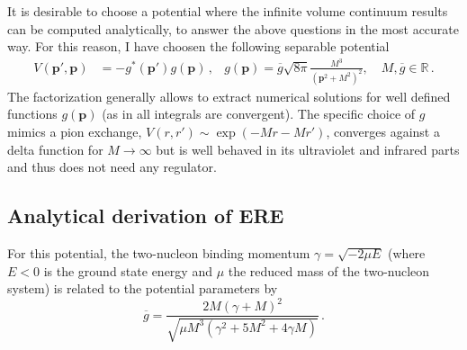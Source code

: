 \documentclass[
    aps,
    prl,
    showkeys,
    nofootinbib,
    floatfix
]{revtex4-1}
\renewcommand{\vec}[1]{\boldsymbol{#1}}
\begin{document}
It is desirable to choose a potential where the infinite volume continuum results can be computed analytically, to answer the above questions in the most accurate way.
For this reason, I have choosen the following separable potential
\begin{align}
	V(\vec p', \vec p) &= - g^*(\vec p') g(\vec p) \, ,
	&
	g(\vec{p})=\overline{g} \sqrt{8 \pi} \frac{M^{3}}{\left(\vec{p}^{2}+M^{2}\right)^{2}}, \quad M, \overline{g} \in \mathbb{R}
	\, .
\end{align}
The factorization generally allows to extract numerical solutions for well defined functions $g(\vec p)$ (as in all integrals are convergent).
The specific choice of $g$ mimics a pion exchange, $V(r, r') \sim \exp(- M r - M r')$, converges against a delta function for $M\to \infty$ but is well behaved in its ultraviolet and infrared parts and thus does not need any regulator.

\subsection{Analytical derivation of ERE}

For this potential, the two-nucleon binding momentum $\gamma = \sqrt{-2 \mu E}$ (where $E < 0$ is the ground state energy and $\mu$ the reduced mass of the two-nucleon system) is related to the potential parameters by
\begin{equation}\label{def:g-lr-binding}
	\overline{g} = \frac{2M(\gamma+M)^{2}}{\sqrt{\mu M^{3}\left(\gamma^{2}+5 M^{2}+4 \gamma M\right)}} \, .
\end{equation}
\end{document}

